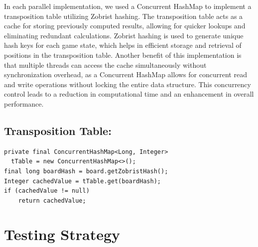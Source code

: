 \documentclass[conference, 11pt]{IEEEtran}
\begin{document}
In each parallel implementation, we used a Concurrent HashMap to implement a transposition table utilizing Zobrist hashing. The transposition table acts as a cache for storing previously computed results, allowing for quicker lookups and eliminating redundant calculations. Zobrist hashing is used to generate unique hash keys for each game state, which helps in efficient storage and retrieval of positions in the transposition table.
Another benefit of this implementation is that multiple threads can access the cache simultaneously without synchronization overhead, as a Concurrent HashMap allows for concurrent read and write operations without locking the entire data structure. This concurrency control leads to a reduction in computational time and an enhancement in overall performance.

\subsection{Transposition Table:}
\lstset{basicstyle=\small}
\begin{lstlisting}
private final ConcurrentHashMap<Long, Integer>
  tTable = new ConcurrentHashMap<>();
final long boardHash = board.getZobristHash();
Integer cachedValue = tTable.get(boardHash);
if (cachedValue != null) 
    return cachedValue;

\end{lstlisting}


\section{Testing Strategy}
\vspace{10pt}
\end{document}
